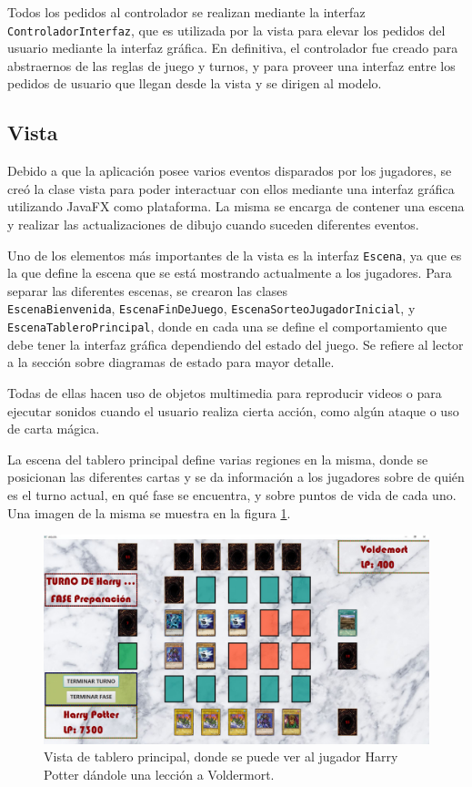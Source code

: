 	Todos los pedidos al controlador se realizan mediante la interfaz \texttt{ControladorInterfaz}, que es utilizada por la vista para elevar los pedidos del usuario mediante la interfaz gráfica. En definitiva, el controlador fue creado para abstraernos de las reglas de juego y turnos, y para proveer una interfaz entre los pedidos de usuario que llegan desde la vista y se dirigen al modelo.
	
	\subsection{Vista}
	
	Debido a que la aplicación posee varios eventos disparados por los jugadores, se creó la clase vista para poder interactuar con ellos mediante una interfaz gráfica utilizando JavaFX como plataforma. La misma se encarga de contener una escena y realizar las actualizaciones de dibujo cuando suceden diferentes eventos.
	
	Uno de los elementos más importantes de la vista es la interfaz \texttt{Escena}, ya que es la que define la escena que se está mostrando actualmente a los jugadores. Para separar las diferentes escenas, se crearon las clases \\ \texttt{EscenaBienvenida}, \texttt{EscenaFinDeJuego}, \texttt{EscenaSorteoJugadorInicial}, y \\ \texttt{EscenaTableroPrincipal}, donde en cada una se define el comportamiento que debe tener la interfaz gráfica dependiendo del estado del juego. Se refiere al lector a la sección sobre diagramas de estado para mayor detalle.
	
	Todas de ellas hacen uso de objetos multimedia para reproducir videos o para ejecutar sonidos cuando el usuario realiza cierta acción, como algún ataque o uso de carta mágica.
	
	La escena del tablero principal define varias regiones en la misma, donde se posicionan las diferentes cartas y se da información a los jugadores sobre de quién es el turno actual, en qué fase se encuentra, y sobre puntos de vida de cada uno. Una imagen de la misma se muestra en la figura \ref{vista_tablero_principal}.
	
	\begin{figure}[H]
		\centering
		\includegraphics[scale=0.3]{includes/vista_tablero_principal}
		\caption{Vista de tablero principal, donde se puede ver al jugador Harry Potter dándole una lección a Voldermort.}
		\label{vista_tablero_principal}
	\end{figure}
	

